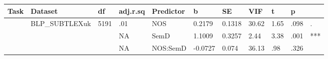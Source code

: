 \begin{table}[ht]
\centering
\begingroup\normalsize
\begin{tabular}{lllllllllll}
  \hline
Task & Dataset & df & adj.r.sq & Predictor & b & SE & VIF & t & p &  \\ 
  \hline
 & BLP\_SUBTLEXuk & 5191 & .01 & NOS & 0.2179 & 0.1318 & 30.62 & 1.65 & .098 & . \\ 
   &  &  & NA & SemD & 1.1009 & 0.3257 & 2.44 & 3.38 & .001 & *** \\ 
   &  &  & NA & NOS:SemD & -0.0727 & 0.074 & 36.13 & .98 & .326 &   \\ 
   \hline
\end{tabular}
\endgroup
\end{table}
